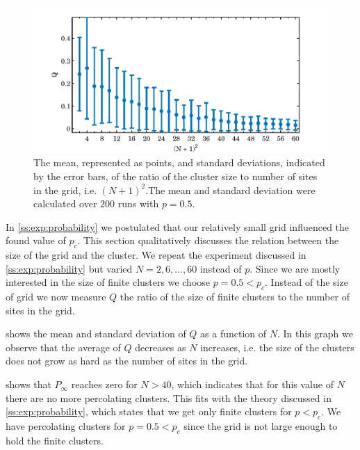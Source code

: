 \begin{figure}
	\centering
	\includegraphics[width=\textwidth]{./img/assignment_b_mean_std_n.pdf}
	\caption{The mean, represented as points, and standard deviations, indicated by the error bars, of the ratio of the cluster size to number of sites in the grid, i.e. $(N + 1)^2$.The mean and standard deviation were calculated over $200$ runs with $p = 0.5$.}
	\label{fig:experiment:size:mean_std_clusters}
\end{figure}

In \cref{ss:exp:probability} we postulated that our relatively small grid influenced the found value of $p_c$. This section qualitatively discusses the relation between the size of the grid and the cluster. We repeat the experiment discussed in \cref{ss:exp:probability} but varied $N = 2, 6, \dotsc, 60$ instead of $p$. Since we are mostly interested in the size of finite clusters we choose $p = 0.5 < p_c$. Instead of the size of grid we now measure $Q$ the ratio of the size of finite clusters to the number of sites in the grid. 

 shows the mean and standard deviation of $Q$ as a function of $N$. In this graph we observe that the average of $Q$ decreases as $N$ increases, i.e. the size of the clusters does not grow as hard as the number of sites in the grid.  

 shows that $P_\infty$ reaches zero for $N > 40$, which indicates that for this value of $N$ there are no more percolating clusters. This fits with the theory discussed in \cref{ss:exp:probability}, which states that we get only finite clusters for $p < p_c$. We have percolating clusters for $p = 0.5 < p_c$ since the grid is not large enough to hold the finite clusters.\\ 

